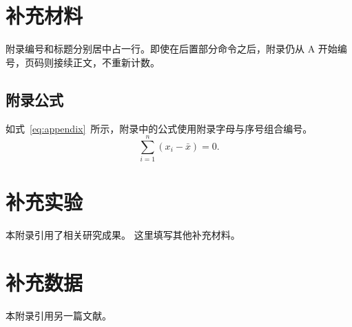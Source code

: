 \chapter{补充材料}
\label{app:extra}
附录编号和标题分别居中占一行。即使在后置部分命令之后，附录仍从 A 开始编号，页码则接续正文，不重新计数。
\section{附录公式}
如式~\eqref{eq:appendix}~所示，附录中的公式使用附录字母与序号组合编号。
\begin{equation}
  \sum_{i=1}^{n}(x_i-\bar{x})=0 .
  \label{eq:appendix}
\end{equation}


\chapter{补充实验}
\begin{gzuappendixrefs}

本附录引用了相关研究成果\cite{zhangkun1994}。
这里填写其他补充材料\cite{lin2013synthesis}。

\end{gzuappendixrefs}

\chapter{补充数据}
\begin{gzuappendixrefs}
本附录引用另一篇文献\cite{zhukezhen1973}。
\end{gzuappendixrefs}
